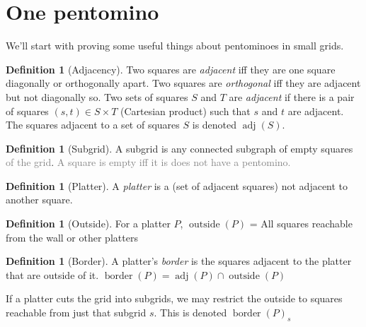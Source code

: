 \documentclass{article}
\theoremstyle{definition}%
\newtheorem{definition}[theorem]{Definition}
\newcommand{\minordetail}[1]{\textcolor{gray}{#1}}
\newcommand{\newterm}[1]{\textit{#1}}
\newcommand{\adj}{\operatorname{adj}}
\newcommand{\border}{\operatorname{border}}
\newcommand{\outside}{\operatorname{outside}}
\begin{document}





\section{One pentomino}

We'll start with proving some useful things about pentominoes in small grids.

\begin{definition}[Adjacency]
Two squares are \newterm{adjacent} iff they are one square diagonally or orthogonally apart. Two squares are \newterm{orthogonal} iff they are adjacent but not diagonally so. Two sets of squares $S$ and $T$ are \newterm{adjacent} if there is a pair of squares $(s, t) \in S \times T$ (Cartesian product) such that $s$ and $t$ are adjacent. The squares adjacent to a set of squares $S$ is denoted $\adj(S)$.
\end{definition}

\begin{definition}[Subgrid]
A subgrid is any connected subgraph of empty squares \minordetail{of the grid}. \minordetail{A square is empty iff it is does not have a pentomino.}
\end{definition}

\begin{definition}[Platter]
A \newterm{platter} is a (set of adjacent squares) not adjacent to another square.%
\end{definition}

\begin{definition}[Outside]
For a platter $P$, $\outside(P)$ = All squares reachable from the wall or other platters
\end{definition}

\begin{definition}[Border]
A platter's \newterm{border} is the squares adjacent to the platter that are outside of it. $\border(P) = \adj(P) \cap \outside(P)$

If a platter cuts the grid into subgrids, we may restrict the outside to squares reachable from just that subgrid $s$. This is denoted $\border(P)_s$
\end{definition}
\end{document}
